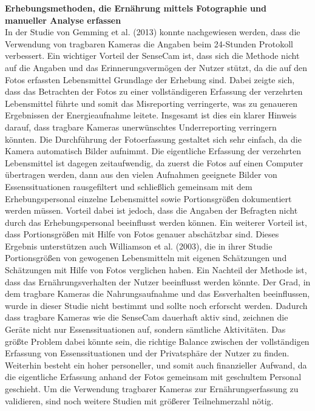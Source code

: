 \textbf{Erhebungsmethoden, die Ernährung mittels Fotographie und manueller Analyse erfassen}\\
In der Studie von Gemming et al. (2013) konnte nachgewiesen werden, dass die Verwendung von tragbaren Kameras die Angaben beim 24-Stunden Protokoll verbessert. Ein wichtiger Vorteil der SenseCam ist, dass sich die Methode nicht auf die Angaben und das Erinnerungsvermögen der Nutzer stützt, da die auf den Fotos erfassten Lebensmittel Grundlage der Erhebung sind. Dabei zeigte sich, dass das Betrachten der Fotos zu einer vollständigeren Erfassung der verzehrten Lebensmittel führte und somit das Misreporting verringerte, was zu genaueren Ergebnissen der Energieaufnahme leitete. Insgesamt ist dies ein klarer Hinweis darauf, dass tragbare Kameras unerwünschtes Underreporting verringern könnten. Die Durchführung der Fotoerfassung gestaltet sich sehr einfach, da die Kamera automatisch Bilder aufnimmt. Die eigentliche Erfassung der verzehrten Lebensmittel ist dagegen zeitaufwendig, da zuerst die Fotos auf einen Computer übertragen werden, dann aus den vielen Aufnahmen geeignete Bilder von Essenssituationen rausgefiltert und schließlich gemeinsam mit dem Erhebungspersonal einzelne Lebensmittel sowie Portionsgrößen dokumentiert werden müssen. Vorteil dabei ist jedoch, dass die Angaben der Befragten nicht durch das Erhebungspersonal beeinflusst werden können. Ein weiterer Vorteil ist, dass Portionsgrößen mit Hilfe von Fotos genauer abschätzbar sind. Dieses Ergebnis unterstützen auch Williamson et al. (2003), die in ihrer Studie Portionsgrößen von gewogenen Lebensmitteln mit eigenen Schätzungen und Schätzungen mit Hilfe von Fotos verglichen haben. Ein Nachteil der Methode ist, dass das Ernährungsverhalten der Nutzer beeinflusst werden könnte. Der Grad, in dem tragbare Kameras die Nahrungsaufnahme und das Essverhalten beeinflussen, wurde in dieser Studie nicht bestimmt und sollte noch erforscht werden. Dadurch dass tragbare Kameras wie die SenseCam dauerhaft aktiv sind, zeichnen die Geräte nicht nur Essenssituationen auf, sondern sämtliche Aktivitäten. Das größte Problem dabei könnte sein, die richtige Balance zwischen der vollständigen Erfassung von Essenssituationen und der Privatsphäre der Nutzer zu finden. Weiterhin besteht ein hoher personeller, und somit auch finanzieller Aufwand, da die eigentliche Erfassung anhand der Fotos gemeinsam mit geschultem Personal geschieht. Um die Verwendung tragbarer Kameras zur  Ernährungserfassung zu validieren, sind noch weitere Studien mit größerer Teilnehmerzahl nötig. \\
